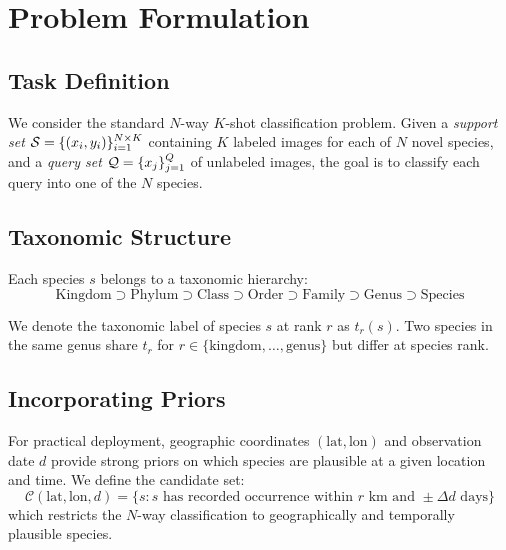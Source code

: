 \section{Problem Formulation}

\label{sec:problem}

\subsection{Task Definition}

We consider the standard $N$-way $K$-shot classification problem. Given a
\emph{support set} $\mathcal{S} = \{(x_i, y_i)\}_{i=1}^{N \times K}$
containing $K$ labeled images for each of $N$ novel species, and a
\emph{query set} $\mathcal{Q} = \{x_j\}_{j=1}^{Q}$ of unlabeled images, the
goal is to classify each query into one of the $N$ species.

\subsection{Taxonomic Structure}

Each species $s$ belongs to a taxonomic hierarchy:
\begin{equation}
  \text{Kingdom} \supset \text{Phylum} \supset \text{Class} \supset
  \text{Order} \supset \text{Family} \supset \text{Genus} \supset
  \text{Species}
\end{equation}

We denote the taxonomic label of species $s$ at rank $r$ as $t_r(s)$.
Two species in the same genus share $t_r$ for $r \in
\{\text{kingdom}, \ldots, \text{genus}\}$ but differ at species rank.

\subsection{Incorporating Priors}

For practical deployment, geographic coordinates $(\text{lat},
\text{lon})$ and observation date $d$ provide strong priors on which
species are plausible at a given location and time. We define the
candidate set:
\begin{equation}
  \mathcal{C}(\text{lat}, \text{lon}, d) = \{s : s \text{ has recorded
    occurrence within } r \text{ km and } \pm \Delta d \text{ days}\}
\end{equation}
which restricts the $N$-way classification to geographically and
temporally plausible species.



